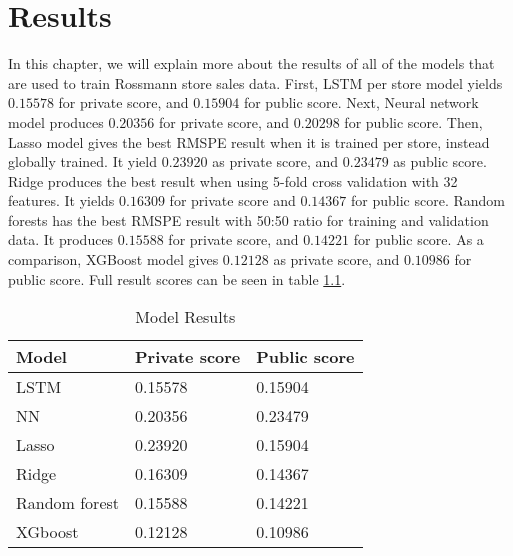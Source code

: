 \chapter{Results}
In this chapter, we will explain more about the results of all of the models that are used to train Rossmann store sales data. 
First, LSTM per store model yields $0.15578$ for private score, and $0.15904$ for public score. Next, Neural network model produces $0.20356$ for private score, and $0.20298$ for public score. Then, Lasso model gives the best RMSPE result when it is trained per store, instead globally trained. It yield $0.23920$ as private score, and $0.23479$ as public score. Ridge produces the best result when using 5-fold cross validation with 32 features. It yields $0.16309$ for private score and $0.14367$ for public score. Random forests has the best RMSPE result with 50:50 ratio for training and validation data. It produces $0.15588$ for private score, and $0.14221$ for public score. As a comparison, XGBoost model gives $0.12128$ as private score, and $0.10986$ for public score. Full result scores can be seen in table \ref{tab:result}.
\begin{table}[H]
	\centering
	\caption{Model Results}
	\label{tab:result}
	\begin{tabular}{|m{200pt}|m{100pt}|m{100pt}|}
		\hline
		Model & Private score & Public score \\ \hline
		LSTM & 0.15578 & 0.15904 \\ \hline
		NN & 0.20356 & 0.23479 \\ \hline
		Lasso & 0.23920 & 0.15904 \\ \hline
		Ridge & 0.16309 & 0.14367 \\ \hline
		Random forest & 0.15588 & 0.14221 \\ \hline
		XGboost & 0.12128 & 0.10986 \\ \hline
	\end{tabular}
\end{table}